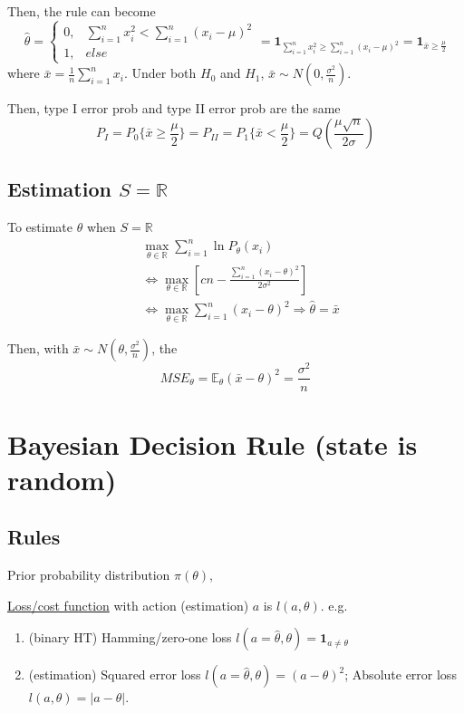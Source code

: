 \documentclass[11pt]{elegantbook}
\begin{document}
Then, the rule can become $$\hat{\theta}=\left\{\begin{matrix}
    0,&\sum_{i=1}^nx_i^2<\sum_{i=1}^n(x_i-\mu)^2\\
    1,&else
\end{matrix}\right.=\mathbf{1}_{\sum_{i=1}^nx_i^2\geq \sum_{i=1}^n(x_i-\mu)^2}=\mathbf{1}_{\bar{x}\geq \frac{\mu}{2}}$$
where $\bar{x}=\frac{1}{n}\sum_{i=1}^nx_i$. Under both $H_0$ and $H_1$, $\bar{x}\sim N(0,\frac{\sigma^2}{n})$.

Then, type I error prob and type II error prob are the same $$P_I=P_0\{\bar{x}\geq \frac{\mu}{2}\}=P_{II}=P_1\{\bar{x}< \frac{\mu}{2}\}=Q\left(\frac{\mu\sqrt{n}}{2\sigma}\right)$$

\subsection*{Estimation $S=\mathbb{R}$}
To estimate $\theta$ when $S=\mathbb{R}$
\begin{equation}
    \begin{aligned}
        &\max_{\theta\in \mathbb{R}}\sum_{i=1}^n\ln P_\theta(x_i)\\
        &\Leftrightarrow \max_{\theta\in \mathbb{R}} \left[cn-\frac{\sum_{i=1}^n(x_i-\theta)^2}{2\sigma^2}\right]\\
        &\Leftrightarrow \max_{\theta\in \mathbb{R}} \sum_{i=1}^n(x_i-\theta)^2 \Rightarrow \hat{\theta}=\bar{x}
    \end{aligned}
    \nonumber
\end{equation}

Then, with $\bar{x}\sim N(\theta,\frac{\sigma^2}{n})$, the $$MSE_\theta=\mathbb{E}_\theta\left(\bar{x}-\theta\right)^2=\frac{\sigma^2}{n}$$

\section{Bayesian Decision Rule (state is random)}
\subsection{Rules}
Prior probability distribution $\pi(\theta)$,

\underline{Loss/cost function} with action (estimation) $a$ is $l(a,\theta)$. e.g.
\begin{enumerate}
    \item (binary HT) Hamming/zero-one loss $l(a=\hat{\theta},\theta)=\mathbf{1}_{a\neq \theta}$
    \item (estimation) Squared error loss $l(a=\hat{\theta},\theta)=(a-\theta)^2$; Absolute error loss $l(a,\theta)=|a-\theta|$.
\end{enumerate}
\end{document}
